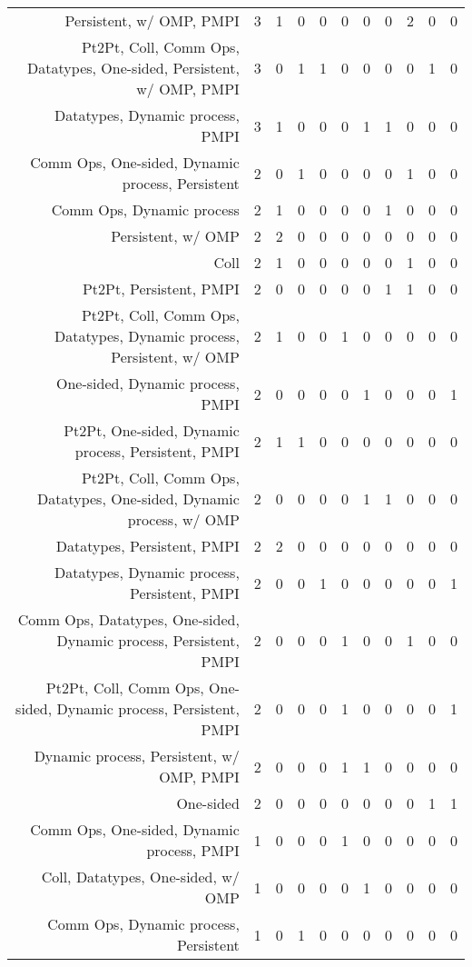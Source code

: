 {\begin{landscape}
\begin{longtable}[htb]{r|c|c|c|c|c|c|c|c|c|c}
{Persistent, w/ OMP, PMPI} & 3 & 1 & 0 & 0 & 0 & 0 & 0 & 2 & 0 & 0 \\%
{Pt2Pt, Coll, Comm Ops, Datatypes, One-sided, Persistent, w/ OMP, PMPI} & 3 & 0 & 1 & 1 & 0 & 0 & 0 & 0 & 1 & 0 \\%
{Datatypes, Dynamic process, PMPI} & 3 & 1 & 0 & 0 & 0 & 1 & 1 & 0 & 0 & 0 \\%
{Comm Ops, One-sided, Dynamic process, Persistent} & 2 & 0 & 1 & 0 & 0 & 0 & 0 & 1 & 0 & 0 \\%
{Comm Ops, Dynamic process} & 2 & 1 & 0 & 0 & 0 & 0 & 1 & 0 & 0 & 0 \\%
{Persistent, w/ OMP} & 2 & 2 & 0 & 0 & 0 & 0 & 0 & 0 & 0 & 0 \\%
{Coll} & 2 & 1 & 0 & 0 & 0 & 0 & 0 & 1 & 0 & 0 \\%
{Pt2Pt, Persistent, PMPI} & 2 & 0 & 0 & 0 & 0 & 0 & 1 & 1 & 0 & 0 \\%
{Pt2Pt, Coll, Comm Ops, Datatypes, Dynamic process, Persistent, w/ OMP} & 2 & 1 & 0 & 0 & 1 & 0 & 0 & 0 & 0 & 0 \\%
{One-sided, Dynamic process, PMPI} & 2 & 0 & 0 & 0 & 0 & 1 & 0 & 0 & 0 & 1 \\%
{Pt2Pt, One-sided, Dynamic process, Persistent, PMPI} & 2 & 1 & 1 & 0 & 0 & 0 & 0 & 0 & 0 & 0 \\%
{Pt2Pt, Coll, Comm Ops, Datatypes, One-sided, Dynamic process, w/ OMP} & 2 & 0 & 0 & 0 & 0 & 1 & 1 & 0 & 0 & 0 \\%
{Datatypes, Persistent, PMPI} & 2 & 2 & 0 & 0 & 0 & 0 & 0 & 0 & 0 & 0 \\%
{Datatypes, Dynamic process, Persistent, PMPI} & 2 & 0 & 0 & 1 & 0 & 0 & 0 & 0 & 0 & 1 \\%
{Comm Ops, Datatypes, One-sided, Dynamic process, Persistent, PMPI} & 2 & 0 & 0 & 0 & 1 & 0 & 0 & 1 & 0 & 0 \\%
{Pt2Pt, Coll, Comm Ops, One-sided, Dynamic process, Persistent, PMPI} & 2 & 0 & 0 & 0 & 1 & 0 & 0 & 0 & 0 & 1 \\%
{Dynamic process, Persistent, w/ OMP, PMPI} & 2 & 0 & 0 & 0 & 1 & 1 & 0 & 0 & 0 & 0 \\%
{One-sided} & 2 & 0 & 0 & 0 & 0 & 0 & 0 & 0 & 1 & 1 \\%
{Comm Ops, One-sided, Dynamic process, PMPI} & 1 & 0 & 0 & 0 & 1 & 0 & 0 & 0 & 0 & 0 \\%
{Coll, Datatypes, One-sided, w/ OMP} & 1 & 0 & 0 & 0 & 0 & 1 & 0 & 0 & 0 & 0 \\%
{Comm Ops, Dynamic process, Persistent} & 1 & 0 & 1 & 0 & 0 & 0 & 0 & 0 & 0 & 0 \\%

\end{longtable}
\end{landscape}}
